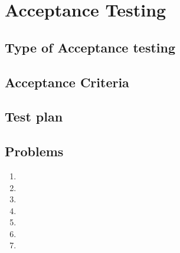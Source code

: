 \setchapterpreamble[u]{\margintoc}
\chapter{Acceptance Testing}
\section{Type of Acceptance testing}
\section{Acceptance Criteria}
\section{Test plan}
\section{Problems}
\begin{enumerate}
    \item 
    \item 
    \item 
    \item 
    \item 
    \item
    \item 
\end{enumerate}